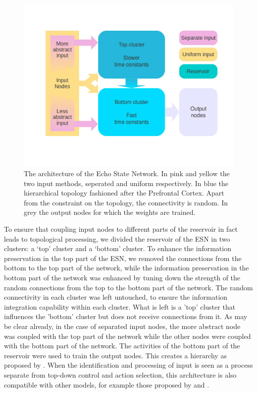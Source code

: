 \documentclass[10pt,a4paper]{report}
\begin{document}
\begin{figure}[bthp]
\includegraphics[width=\textwidth]{figures/reservoir1.jpg}
\caption{The architecture of the Echo State Network. In pink and yellow the two input methods, seperated and uniform respectively. In blue the hierarchical topology fashioned after the Prefrontal Cortex. Apart from the constraint on the topology, the connectivity is random. In grey the output nodes for which the weights are trained.}
\label{ESNarchitecture}
\end{figure}

To ensure that coupling input nodes to different parts of the reservoir in fact leads to topological processing, we divided the reservoir of the ESN in two clusters: a `top' cluster and a `bottom' cluster. To enhance the information preservation in the top part of the ESN, we removed the connections from the bottom to the top part of the network, while the information preservation in the bottom part of the network was enhanced by tuning down the strength of the random connections from the top to the bottom part of the network. The random connectivity in each cluster was left untouched, to ensure the information integration capability within each cluster. What is left is a 'top' cluster that influences the 'bottom' cluster but does not receive connections from it. As may be clear already, in the case of separated input nodes, the more abstract node was coupled with the top part of the network while the other nodes were coupled with the bottom part of the network. The activities of the bottom part of the reservoir were used to train the output nodes. This creates a hierarchy as proposed by \citet{Koechlin2007}. When the identification and processing of input is seen as a process separate from top-down control and action selection, this architecture is also compatible with other models, for example those proposed by \citet{Botvinick2007} and \citet{Fuster2002}. 
\end{document}
